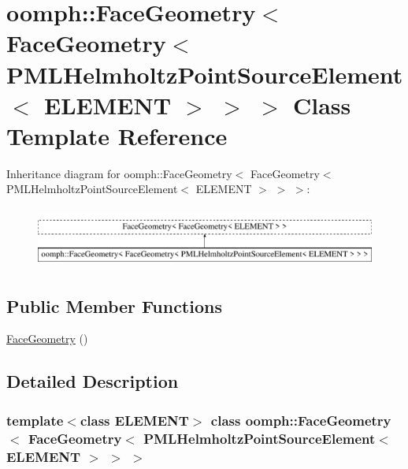 \hypertarget{classoomph_1_1FaceGeometry_3_01FaceGeometry_3_01PMLHelmholtzPointSourceElement_3_01ELEMENT_01_4_01_4_01_4}{}\section{oomph\+:\+:Face\+Geometry$<$ Face\+Geometry$<$ P\+M\+L\+Helmholtz\+Point\+Source\+Element$<$ E\+L\+E\+M\+E\+NT $>$ $>$ $>$ Class Template Reference}
\label{classoomph_1_1FaceGeometry_3_01FaceGeometry_3_01PMLHelmholtzPointSourceElement_3_01ELEMENT_01_4_01_4_01_4}
Inheritance diagram for oomph\+:\+:Face\+Geometry$<$ Face\+Geometry$<$ P\+M\+L\+Helmholtz\+Point\+Source\+Element$<$ E\+L\+E\+M\+E\+NT $>$ $>$ $>$\+:\begin{figure}[H]
\begin{center}
\leavevmode
\includegraphics[height=2.000000cm]{classoomph_1_1FaceGeometry_3_01FaceGeometry_3_01PMLHelmholtzPointSourceElement_3_01ELEMENT_01_4_01_4_01_4}
\end{center}
\end{figure}
\subsection*{Public Member Functions}
\begin{DoxyCompactItemize}
\item 
\hyperlink{classoomph_1_1FaceGeometry_3_01FaceGeometry_3_01PMLHelmholtzPointSourceElement_3_01ELEMENT_01_4_01_4_01_4_a5f758bdf1350e4b9a2cea1bcfa26df76}{Face\+Geometry} ()
\end{DoxyCompactItemize}


\subsection{Detailed Description}
\subsubsection*{template$<$class E\+L\+E\+M\+E\+NT$>$\newline
class oomph\+::\+Face\+Geometry$<$ Face\+Geometry$<$ P\+M\+L\+Helmholtz\+Point\+Source\+Element$<$ E\+L\+E\+M\+E\+N\+T $>$ $>$ $>$}

